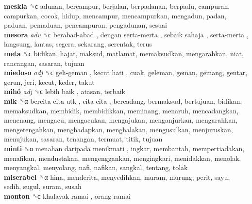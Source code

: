 \textbf{meskla} ␝ϲ  adunan, bercampur, berjalan, berpadanan, berpadu, campuran, campurkan, cocok, hidup, mencampur, mencampurkan, mengadun, padan, paduan, pemaduan, pencampuran, pengadunan, sesuai  \\
\textbf{mesora} \emph{adv}  ␝ϲ   berabad-abad ,  dengan serta-merta ,  sebaik sahaja ,  serta-merta , langsung, lantas, segera, sekarang, serentak, terus  \\
\textbf{meta} ␝ϲ  bidikan, hajat, maksud, matlamat, memaksudkan, mengarahkan, niat, rancangan, sasaran, tujuan  \\
\textbf{miedoso} \emph{adj}  ␝ϲ   geli-geman ,  kecut hati , cuak, geleman, geman, gemang, gentar, gerun, jeri, kecut, keder, takut  \\
\textbf{mihó} \emph{adj}  ␝ϲ   lebih baik , atasan, terbaik  \\
\textbf{mik} ␝α   bercita-cita utk ,  cita-cita , bercadang, bermaksud, bertujuan, bidikan, memaksudkan, membidik, membidikkan, meminang, menaruh, mencadangkan, menenang, mengacu, mengacukan, mengajukan, menganjurkan, mengarahkan, mengetengahkan, menghadapkan, menghalakan, mengusulkan, menjuruskan, menujukan, sasaran, tenangan, termuat, titik, tujuan  \\
\textbf{minti} ␝α   menahan daripada menikmati , ingkar, membantah, mempertiadakan, menafikan, mendustakan, mengenggankan, mengingkari, menidakkan, menolak, menyangkal, menyolang, nafi, nafikan, sangkal, tentang, tolak  \\
\textbf{miserabel} ␝α  hina, menderita, menyedihkan, muram, murung, perit, sayu, sedih, sugul, suram, susah  \\
\textbf{monton} ␝ϲ   khalayak ramai ,  orang ramai   \\
